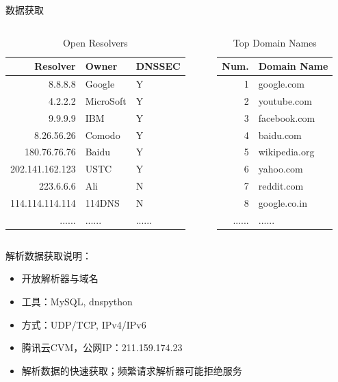\documentclass{beamer}
\begin{document}
  \begin{frame}{数据获取}
    \begin{columns}
      
      \begin{column}{0.5\textwidth}
        \begin{table}
          \tiny
        \begin{tabular}{r|l|l}
          \toprule
          Resolver& Owner&DNSSEC\\
          \midrule
          8.8.8.8 & Google&Y \\
          4.2.2.2&     MicroSoft&Y \\
          9.9.9.9&  IBM&Y \\
          8.26.56.26& Comodo&Y \\
          180.76.76.76&Baidu&Y\\
          202.141.162.123&USTC&Y\\
          223.6.6.6&Ali&N \\
          114.114.114.114 & 114DNS&N \\
          ......&...... &......\\
          \bottomrule
          \end{tabular}
          \caption{\scriptsize{Open Resolvers}}
        \end{table}
      \end{column}
      \begin{column}{0.5\textwidth}
        \begin{table}
          \tiny
        \begin{tabular}{r|l}
          \toprule
          Num. & Domain Name\\
          \midrule
          1&google.com\\
          2&youtube.com\\
          3&facebook.com\\
          4&baidu.com\\
          5&wikipedia.org\\
          6&yahoo.com\\
          7&reddit.com\\
          8&google.co.in\\
          ......&...... \\
          \bottomrule
          \end{tabular}
          \caption{\scriptsize{Top Domain Names}}
        \end{table}
      \end{column}
      \end{columns}


解析数据获取说明：
  \begin{itemize}
    \item 开放解析器与域名
    \item 工具：MySQL, dnspython
    \item 方式：UDP/TCP, IPv4/IPv6
    \item 腾讯云CVM，公网IP：211.159.174.23
    \item 解析数据的快速获取；频繁请求解析器可能拒绝服务
  \end{itemize}
  \end{frame}
\end{document}
